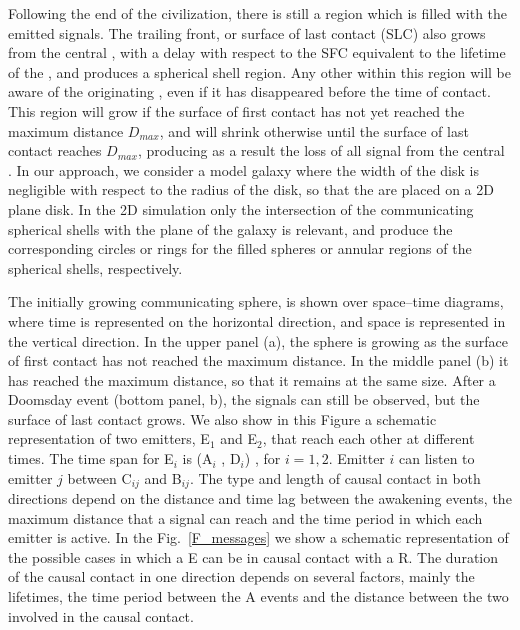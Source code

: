 Following the end of the civilization, there is still a region which
is filled with the emitted signals.
%
The trailing front, or surface of last contact (SLC) also grows from
the central \ceti{}, with a delay with respect to the SFC equivalent
to the lifetime of the \ceti{}, and produces a spherical shell region.
%
Any other \ceti{} within this region will be aware of the originating
\ceti{}, even if it has disappeared before the time of contact.
%
This region will grow if the surface of first contact has not yet
reached the maximum distance $D_{max}$, and will shrink otherwise
until the surface of last contact reaches $D_{max}$, producing as a
result the loss of all signal from the central \ceti{}.
%
In our approach, we consider a model galaxy where the width of the
disk is negligible with respect to the radius of the disk, so that the
\cetis{} are placed on a 2D plane disk.
%
In the 2D simulation only the intersection of the communicating
spherical shells with the plane of the galaxy is relevant, and produce
the corresponding circles or rings for the filled spheres or annular
regions of the spherical shells, respectively.

  


The initially growing communicating sphere, is shown over space--time
diagrams, where time is represented on the horizontal direction, and
space is represented in the vertical direction.
%
In the upper panel (a), the sphere is growing as the surface of first
contact has not reached the maximum distance.
%
In the middle panel (b) it has reached the maximum distance, so that
it remains at the same size.
%
After a Doomsday event (bottom panel, b), the signals can still be
observed, but the surface of last contact grows.
%
We also show in this Figure a schematic representation of two
emitters, E$_1$ and E$_2$, that reach each other at different times.
%
The time span for E$_i$ is (A$_i$ , D$_i$) , for $i = {1, 2}$.
%
Emitter $i$ can listen to emitter $j$ between C$_{ij}$ and B$_{ij}$.
%
The type and length of causal contact in both directions depend on the
distance and time lag between the awakening events, the maximum
distance that a signal can reach and the time period in which each
emitter is active.
%
%
In the Fig.~\ref{F_messages} we show a schematic representation of the
possible cases in which a \ceti{} E can be in causal contact with a
\ceti{} R.
%
The duration of the causal contact in one direction depends on several
factors, mainly the lifetimes, the time period between the A events
and the distance between the two \cetis{} involved in the causal
contact.



